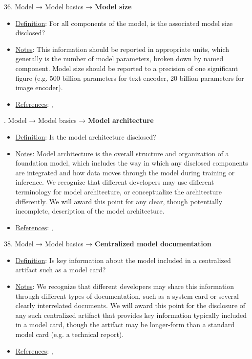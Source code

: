 36. Model → Model basics → \textbf{Model size}
\vspace{-\parskip}
\begin{itemize}
\item
\underline{Definition}: For all components of the model, is the associated model size disclosed?
\item
\underline{Notes}: This information should be reported in appropriate units, which generally is the number of model parameters, broken down by named component. Model size should be reported to a precision of one significant figure (e.g. 500 billion parameters for text encoder, 20 billion parameters for image encoder).
\item
\underline{References}: \citet{mitchell2019model}, \citet{crisan2022interactive}
\end{itemize} \vspace{\baselineskip}


. Model → Model basics → \textbf{Model architecture}
\vspace{-\parskip}
\begin{itemize}
\item
\underline{Definition}: Is the model architecture disclosed?
\item
\underline{Notes}: Model architecture is the overall structure and organization of a foundation model, which includes the way in which any disclosed components are integrated and how data moves through the model during training or inference. We recognize that different developers may use different terminology for model architecture, or conceptualize the architecture differently. We will award this point for any clear, though potentially incomplete, description of the model architecture.
\item
\underline{References}: \citet{mitchell2019model}, \citet{crisan2022interactive}
\end{itemize} \vspace{\baselineskip}


38. Model → Model basics → \textbf{Centralized model documentation}
\vspace{-\parskip}
\begin{itemize}
\item
\underline{Definition}: Is key information about the model included in a centralized artifact such as a model card?
\item
\underline{Notes}: We recognize that different developers may share this information through different types of documentation, such as a system card or several clearly interrelated documents. We will award this point for the disclosure of any such centralized artifact that provides key information typically included in a model card, though the artifact may be longer-form than a standard model card (e.g. a technical report).
\item
\underline{References}: \citet{mitchell2019model}, \citet{crisan2022interactive}
\end{itemize} \vspace{\baselineskip}


